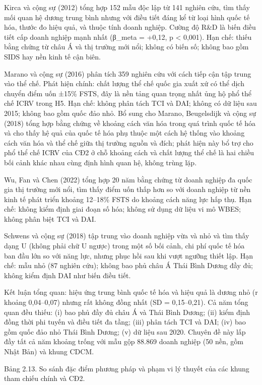 \documentclass[
  a4paper,
  13pt]{extreport}
\begin{document}
Kirca và cộng sự (2012) tổng hợp 152 mẫu độc lập từ 141 nghiên cứu, tìm
thấy mối quan hệ dương trung bình nhưng với điều tiết đáng kể từ loại
hình quốc tế hóa, thước đo hiệu quả, và thuộc tính doanh nghiệp. Cường
độ R\&D là biến điều tiết cấp doanh nghiệp mạnh nhất (β\_meta = +0,12, p
\textless{} 0,001). Hạn chế: thiếu bằng chứng từ châu Á và thị trường
mới nổi; không có biến số; không bao gồm SIDS hay nền kinh tế cận biên.

Marano và cộng sự (2016) phân tích 359 nghiên cứu với cách tiếp cận tập
trung vào thể chế. Phát hiện chính: chất lượng thể chế quốc gia xuất xứ
có thể dịch chuyển điểm uốn ±15\% FSTS, đây là nền tảng quan trọng nhất
ủng hộ phổ thể chế ICRV trong H5. Hạn chế: không phân tách TCI và DAI;
không có dữ liệu sau 2015; không bao gồm quốc đảo nhỏ. Bổ sung cho
Marano, Beugelsdijk và cộng sự (2018) tổng hợp bằng chứng về khoảng cách
văn hóa trong quá trình quốc tế hóa và cho thấy hệ quả của quốc tế hóa
phụ thuộc một cách hệ thống vào khoảng cách văn hóa và thể chế giữa thị
trường nguồn và đích; phát hiện này bổ trợ cho phổ thể chế ICRV của CĐ2
ở chỗ khoảng cách và chất lượng thể chế là hai chiều bối cảnh khác nhau
cùng định hình quan hệ, không trùng lặp.

Wu, Fan và Chen (2022) tổng hợp 20 năm bằng chứng từ doanh nghiệp đa
quốc gia thị trường mới nổi, tìm thấy điểm uốn thấp hơn so với doanh
nghiệp từ nền kinh tế phát triển khoảng 12--18\% FSTS do khoảng cách
năng lực hấp thụ. Hạn chế: không kiểm định giai đoạn số hóa; không sử
dụng dữ liệu vi mô WBES; không phân biệt TCI và DAI.

Schwens và cộng sự (2018) tập trung vào doanh nghiệp vừa và nhỏ và tìm
thấy dạng U (không phải chữ U ngược) trong một số bối cảnh, chi phí quốc
tế hóa ban đầu lớn so với năng lực, nhưng phục hồi sau khi vượt ngưỡng
thiết lập. Hạn chế: mẫu nhỏ (87 nghiên cứu); không bao phủ châu Á Thái
Bình Dương đầy đủ; không kiểm định DAI như biến điều tiết.

Kết luận tổng quan: hiệu ứng trung bình quốc tế hóa và hiệu quả là dương
nhỏ (r khoảng 0,04--0,07) nhưng rất không đồng nhất (SD = 0,15--0,21).
Cả năm tổng quan đều thiếu: (i) bao phủ đầy đủ châu Á và Thái Bình
Dương; (ii) kiểm định đồng thời phi tuyến và điều tiết đa tầng; (iii)
phân tách TCI và DAI; (iv) bao gồm quốc đảo nhỏ Thái Bình Dương; (v) dữ
liệu sau 2020. Chuyên đề này lấp đầy tất cả năm khoảng trống với mẫu gộp
88.869 doanh nghiệp (50 nền, gồm Nhật Bản) và khung CDCM.

Bảng 2.13. So sánh đặc điểm phương pháp và phạm vi lý thuyết của các
khung tham chiếu chính và CĐ2.
\end{document}
